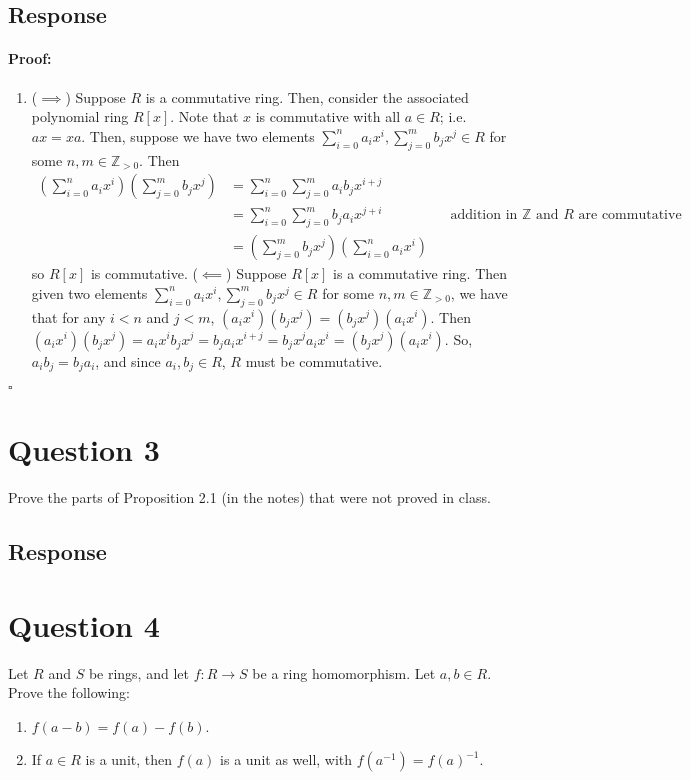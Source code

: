 \documentclass [12pt] {article}
\newcommand{\Z}{\mathbb{Z}}
\newenvironment{proof}{\paragraph{Proof:}}{\hfill$\square$}
\begin{document}
\subsection*{Response}
\begin{proof}
    \begin{enumerate}
        \item ($\implies$) Suppose $R$ is a commutative ring. Then, consider the associated 
            polynomial ring $R[x]$. Note that $x$ is commutative with all $a \in R$; i.e. $ax = xa$.
            Then, suppose we have two elements $\sum^{n}_{i = 0} a_i x^i, \sum^{m}_{j = 0} b_j x^j \in R$
            for some $n, m \in \Z_{> 0}$. Then
            \begin{align*}
                \left( \sum^{n}_{i = 0} a_i x^i \right) \left( \sum^{m}_{j = 0} b_j x^j \right)
                &= \sum^{n}_{i = 0} \sum^{m}_{j = 0} a_i b_j x^{i + j} \\
                &= \sum^{n}_{i = 0} \sum^{m}_{j = 0} b_j a_i x^{j + i} 
                && \text{addition in } \Z \text{ and } R \text{ are commutative} \\
                &= \left( \sum^{m}_{j = 0} b_j x^j \right) \left( \sum^{n}_{i = 0} a_i x^i \right)
            \end{align*}
            so $R[x]$ is commutative.
            \newline
            ($\impliedby$) Suppose $R[x]$ is a commutative ring. Then given two elements
            $\sum^{n}_{i = 0} a_i x^i, \sum^{m}_{j = 0} b_j x^j \in R$ for some $n, m \in \Z_{> 0}$,
            we have that for any $i < n$ and $j < m$, $(a_i x^i)(b_j x^j) = (b_j x^j)(a_i x^i)$. Then
            $(a_i x^i)(b_j x^j) = a_i x^i b_j x^j = b_j a_i x^{i + j} = b_j x^j a_i x^i = (b_j x^j)(a_i x^i)$.
            So, $a_i b_j = b_j a_i$, and since $a_i, b_j \in R$, $R$ must be commutative.
    \end{enumerate}
\end{proof}
\newpage

\section*{Question 3}
Prove the parts of Proposition 2.1 (in the notes) that were not proved in class. 
\subsection*{Response}
\newpage

\section*{Question 4}
Let $R$ and $S$ be rings, and let $f:R\to S$ be a ring homomorphism. Let $a,b\in R$. Prove the following: 
    \begin{enumerate}
        \item $f(a-b)=f(a)-f(b)$.
        \item If $a\in R$ is a unit, then $f(a)$ is a unit as well, with $f(a^{-1})=f(a)^{-1}$.
    \end{enumerate}
\end{document}
